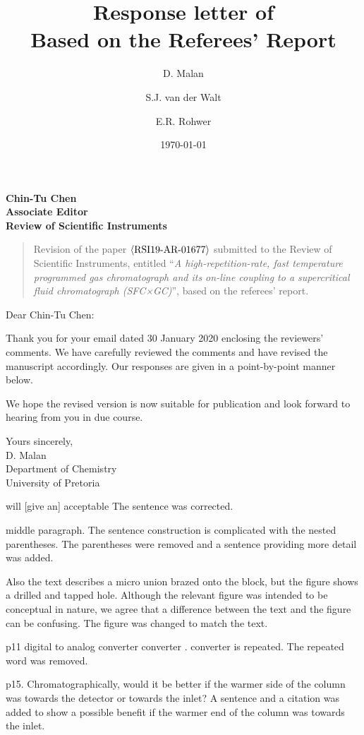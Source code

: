 \documentclass[10pt]{article}
\title{Response letter of \meta{RSI19-AR-01677} \\
  Based on the Referees' Report}
\author{D. Malan \and S.J. van der Walt \and E.R. Rohwer}
\date{\today}
\newcommand\meta[1]{$\langle\hbox{#1}\rangle$}
\newcommand\PaperTitle[1]{``\textit{#1}''}
\begin{document}
\noindent
\textbf{Chin-Tu Chen}\\
\textbf{Associate Editor}\\
\textbf{Review of Scientific Instruments}

\medskip

\begin{quote}
Revision of the paper \meta{RSI19-AR-01677} submitted to the Review of
Scientific Instruments, entitled \PaperTitle{A high-repetition-rate, fast
temperature programmed gas chromatograph and its on-line coupling to a
supercritical fluid chromatograph (SFC×GC)}, based on the referees' report.
\end{quote}

\medskip

\noindent
Dear Chin-Tu Chen: 

Thank you for your email dated 30 January 2020 enclosing the reviewers’ comments. We
have carefully reviewed the comments and have revised the manuscript accordingly. Our
responses are given in a point-by-point manner below. 

We hope the revised version is now suitable for publication and look forward to hearing from you
in due course.

\vspace{\baselineskip}

\noindent
Yours sincerely,\\
D. Malan\\
Department of Chemistry\\
University of Pretoria


\begin{response}{will [give an] acceptable}
 	The sentence was corrected.
\end{response}

\begin{response}{middle paragraph. The sentence construction is complicated with the nested parentheses.
} 
The parentheses were removed and a sentence providing more detail was added.
\end{response}

\begin{response}{Also the text describes a micro union brazed onto the block,
but the figure shows a drilled and tapped hole.
}  Although the relevant figure was intended to be conceptual in nature, we
agree that a difference between the text and the figure can be confusing. The
figure was changed to match the text.
\end{response}

\begin{response}{p11 digital to analog converter converter . converter is repeated. 
	}  The repeated word was removed. 
\end{response}

\begin{response}{p15. Chromatographically, would it be better if the warmer side of the column was towards the detector or towards the inlet?
	}  
	A sentence and a citation was added to show a possible benefit if the warmer end of the column was towards the inlet.
\end{response}
\end{document}
